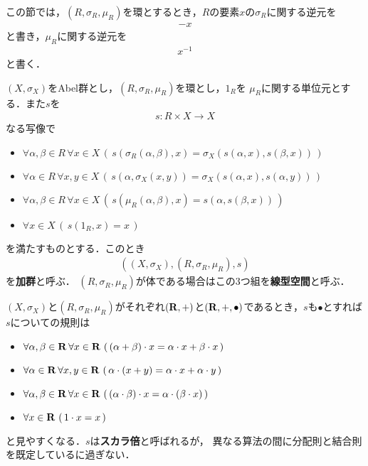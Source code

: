 	この節では，$\left(R,\sigma_R,\mu_R\right)$を環とするとき，$R$の要素$x$の$\sigma_R$に関する逆元を
	\begin{align}
		-x
	\end{align}
	と書き，$\mu_R$に関する逆元を
	\begin{align}
		x^{-1}
	\end{align}
	と書く．
	
	\begin{screen}
		\begin{dfn}[加群]
			$(X,\sigma_X)$をAbel群とし，$(R,\sigma_R,\mu_R)$を環とし，$1_R$を
			$\mu_R$に関する単位元とする．また$s$を
			\begin{align}
				s:R \times X \longrightarrow X
			\end{align}
			なる写像で
			\begin{itemize}
				\item $\forall \alpha,\beta \in R\, \forall x \in X\, \left(\, s(\sigma_R(\alpha,\beta),x)
					= \sigma_X(s(\alpha,x),s(\beta,x))\, \right)$
				\item $\forall \alpha \in R\, \forall x,y \in X\, \left(\, s(\alpha,\sigma_X(x,y))
					= \sigma_X(s(\alpha,x),s(\alpha,y))\, \right)$
				\item $\forall \alpha,\beta \in R\, \forall x \in X\, \left(\, s(\mu_R(\alpha,\beta),x)
					= s(\alpha,s(\beta,x))\, \right)$
				\item $\forall x \in X\, \left(\, s(1_R,x) = x\, \right)$
			\end{itemize}
			を満たすものとする．このとき
			\begin{align}
				\left((X,\sigma_X),(R,\sigma_R,\mu_R),s\right)
			\end{align}
			を{\bf 加群}と呼ぶ．
			$(R,\sigma_R,\mu_R)$が体である場合はこの3つ組を{\bf 線型空間}と呼ぶ．
		\end{dfn}
	\end{screen}
	
	$(X,\sigma_X)$と$(R,\sigma_R,\mu_R)$がそれぞれ$(\mathbf{R},+)$と$(\mathbf{R},+,\bullet)$であるとき，$s$も$\bullet$とすれば
	$s$についての規則は
	\begin{itemize}
		\item $\forall \alpha,\beta \in \mathbf{R}\, \forall x \in \mathbf{R}\, \left(\, (\alpha + \beta) \cdot x
			= \alpha \cdot x + \beta \cdot x\, \right)$
		\item $\forall \alpha \in \mathbf{R}\, \forall x,y \in \mathbf{R}\, \left(\, \alpha \cdot (x+y)
			= \alpha \cdot x + \alpha \cdot y\, \right)$
		\item $\forall \alpha,\beta \in \mathbf{R}\, \forall x \in \mathbf{R}\, \left(\, (\alpha \cdot \beta) \cdot x
			= \alpha \cdot (\beta \cdot x)\, \right)$
		\item $\forall x \in \mathbf{R}\, \left(\, 1 \cdot x = x\, \right)$
	\end{itemize}
	と見やすくなる．$s$は{\bf スカラ倍}と呼ばれるが，
	異なる算法の間に分配則と結合則を既定しているに過ぎない．
	
